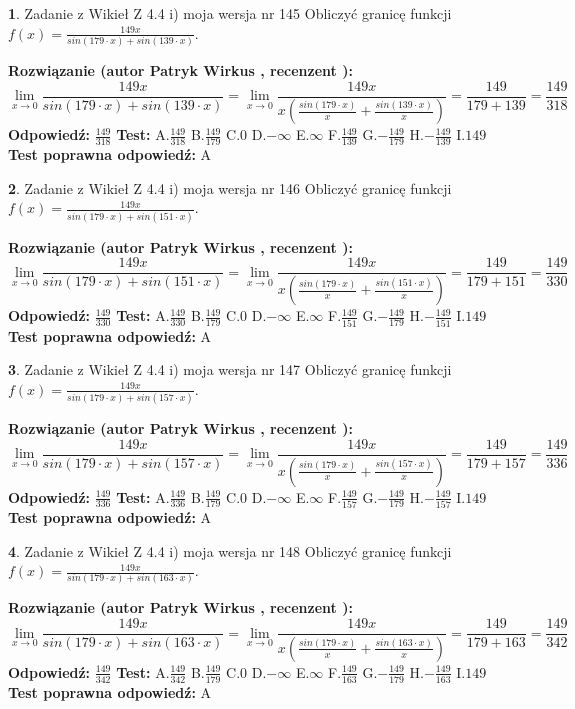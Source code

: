 \documentclass[12pt, a4paper]{article}
\theoremstyle{definition} %
\newtheorem{zad}{}
\newcommand{\zadStart}[1]{\begin{zad}#1\newline}
\newcommand{\zadStop}{\end{zad}}
\newcommand{\rozwStart}[2]{\noindent \textbf{Rozwiązanie (autor #1 , recenzent #2): }\newline}
\newcommand{\rozwStop}{\newline}
\newcommand{\odpStart}{\noindent \textbf{Odpowiedź:}\newline}
\newcommand{\odpStop}{\newline}
\newcommand{\testStart}{\noindent \textbf{Test:}\newline}
\newcommand{\testStop}{\newline}
\newcommand{\kluczStart}{\noindent \textbf{Test poprawna odpowiedź:}\newline}
\newcommand{\kluczStop}{\newline}
\begin{document}
\zadStart{Zadanie z Wikieł Z 4.4 i) moja wersja nr 145}
Obliczyć granicę funkcji $f(x)=\frac{149x}{sin(179\cdot x) +sin(139\cdot x)}$.
\zadStop
\rozwStart{Patryk Wirkus}{}
$$\lim\limits_{x\to 0}\frac{149x}{sin(179\cdot x) +sin(139\cdot x)}=\lim\limits_{x\to 0}\frac{149x}{x(\frac{sin(179\cdot x)}{x}+\frac{sin(139\cdot x)}{x})}=\frac{149}{179+139} = \frac{149}{318}$$
\rozwStop
\odpStart
$\frac{149}{318}$
\odpStop
\testStart
A.$\frac{149}{318}$
B.$\frac{149}{179}$
C.$0$
D.$-\infty$
E.$\infty$
F.$\frac{149}{139}$
G.$-\frac{149}{179}$
H.$-\frac{149}{139}$
I.$149$
\testStop
\kluczStart
A
\kluczStop



\zadStart{Zadanie z Wikieł Z 4.4 i) moja wersja nr 146}
Obliczyć granicę funkcji $f(x)=\frac{149x}{sin(179\cdot x) +sin(151\cdot x)}$.
\zadStop
\rozwStart{Patryk Wirkus}{}
$$\lim\limits_{x\to 0}\frac{149x}{sin(179\cdot x) +sin(151\cdot x)}=\lim\limits_{x\to 0}\frac{149x}{x(\frac{sin(179\cdot x)}{x}+\frac{sin(151\cdot x)}{x})}=\frac{149}{179+151} = \frac{149}{330}$$
\rozwStop
\odpStart
$\frac{149}{330}$
\odpStop
\testStart
A.$\frac{149}{330}$
B.$\frac{149}{179}$
C.$0$
D.$-\infty$
E.$\infty$
F.$\frac{149}{151}$
G.$-\frac{149}{179}$
H.$-\frac{149}{151}$
I.$149$
\testStop
\kluczStart
A
\kluczStop



\zadStart{Zadanie z Wikieł Z 4.4 i) moja wersja nr 147}
Obliczyć granicę funkcji $f(x)=\frac{149x}{sin(179\cdot x) +sin(157\cdot x)}$.
\zadStop
\rozwStart{Patryk Wirkus}{}
$$\lim\limits_{x\to 0}\frac{149x}{sin(179\cdot x) +sin(157\cdot x)}=\lim\limits_{x\to 0}\frac{149x}{x(\frac{sin(179\cdot x)}{x}+\frac{sin(157\cdot x)}{x})}=\frac{149}{179+157} = \frac{149}{336}$$
\rozwStop
\odpStart
$\frac{149}{336}$
\odpStop
\testStart
A.$\frac{149}{336}$
B.$\frac{149}{179}$
C.$0$
D.$-\infty$
E.$\infty$
F.$\frac{149}{157}$
G.$-\frac{149}{179}$
H.$-\frac{149}{157}$
I.$149$
\testStop
\kluczStart
A
\kluczStop



\zadStart{Zadanie z Wikieł Z 4.4 i) moja wersja nr 148}
Obliczyć granicę funkcji $f(x)=\frac{149x}{sin(179\cdot x) +sin(163\cdot x)}$.
\zadStop
\rozwStart{Patryk Wirkus}{}
$$\lim\limits_{x\to 0}\frac{149x}{sin(179\cdot x) +sin(163\cdot x)}=\lim\limits_{x\to 0}\frac{149x}{x(\frac{sin(179\cdot x)}{x}+\frac{sin(163\cdot x)}{x})}=\frac{149}{179+163} = \frac{149}{342}$$
\rozwStop
\odpStart
$\frac{149}{342}$
\odpStop
\testStart
A.$\frac{149}{342}$
B.$\frac{149}{179}$
C.$0$
D.$-\infty$
E.$\infty$
F.$\frac{149}{163}$
G.$-\frac{149}{179}$
H.$-\frac{149}{163}$
I.$149$
\testStop
\kluczStart
A
\kluczStop
\end{document}
